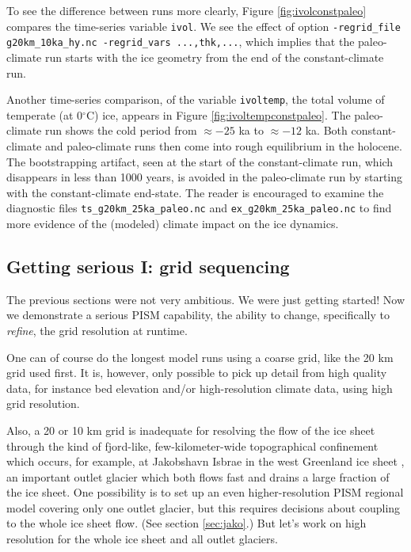 To see the difference between runs more clearly, Figure \ref{fig:ivolconstpaleo} compares the time-series variable \texttt{ivol}.  We see the effect of option \verb|-regrid_file g20km_10ka_hy.nc -regrid_vars ...,thk,...|, which implies that the paleo-climate run starts with the ice geometry from the end of the constant-climate run.

Another time-series comparison, of the variable \verb|ivoltemp|, the total volume of temperate (at 0$^\circ$C) ice, appears in Figure \ref{fig:ivoltempconstpaleo}.  The paleo-climate run shows the cold period from $\approx -25$ ka to $\approx -12$ ka.  Both constant-climate and paleo-climate runs then come into rough equilibrium in the holocene.  The bootstrapping artifact, seen at the start of the constant-climate run, which disappears in less than 1000 years, is avoided in the paleo-climate run by starting with the constant-climate end-state.  The reader is encouraged to examine the diagnostic files \texttt{ts_g20km_25ka_paleo.nc} and \texttt{ex_g20km_25ka_paleo.nc} to find more evidence of the (modeled) climate impact on the ice dynamics.


\subsection{Getting serious I: grid sequencing}  \label{subsect:gridseq}  

The previous sections were not very ambitious.  We were just getting started!  Now we demonstrate a serious PISM capability, the ability to change, specifically to \emph{refine}, the grid resolution at runtime.

One can of course do the longest model runs using a coarse grid, like the 20 km grid used first.  It is, however, only possible to pick up detail from high quality data, for instance bed elevation and/or high-resolution climate data, using high grid resolution.

Also, a 20 or 10 km grid is inadequate for resolving the flow of the ice sheet through the kind of fjord-like, few-kilometer-wide topographical confinement which occurs, for example, at Jakobshavn Isbrae in the west Greenland ice sheet \cite{Joughinetal08}, an important outlet glacier which both flows fast and drains a large fraction of the ice sheet.  One possibility is to set up an even higher-resolution PISM regional model covering only one outlet glacier, but this requires decisions about coupling to the whole ice sheet flow.  (See section \ref{sec:jako}.)  But let's work on high resolution for the whole ice sheet and all outlet glaciers.

